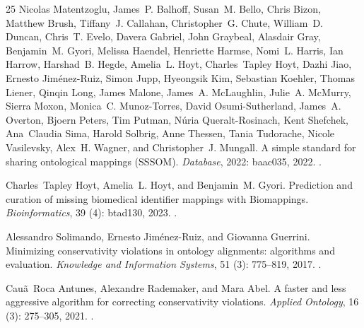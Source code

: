 \documentclass[10pt]{article}
\theoremstyle{accentdef}
\begin{document}
\begin{thebibliography}{25}
Nicolas Matentzoglu, James~P. Balhoff, Susan~M. Bello, Chris Bizon, Matthew
  Brush, Tiffany~J. Callahan, Christopher~G. Chute, William~D. Duncan, Chris~T.
  Evelo, Davera Gabriel, John Graybeal, Alasdair Gray, Benjamin~M. Gyori,
  Melissa Haendel, Henriette Harmse, Nomi~L. Harris, Ian Harrow, Harshad~B.
  Hegde, Amelia~L. Hoyt, Charles~Tapley Hoyt, Dazhi Jiao, Ernesto
  Jim{\'e}nez-Ruiz, Simon Jupp, Hyeongsik Kim, Sebastian Koehler, Thomas
  Liener, Qinqin Long, James Malone, James~A. McLaughlin, Julie~A. McMurry,
  Sierra Moxon, Monica~C. Munoz-Torres, David Osumi-Sutherland, James~A.
  Overton, Bjoern Peters, Tim Putman, Núria Queralt-Rosinach, Kent Shefchek,
  Ana~Claudia Sima, Harold Solbrig, Anne Thessen, Tania Tudorache, Nicole
  Vasilevsky, Alex~H. Wagner, and Christopher~J. Mungall.
\newblock A simple standard for sharing ontological mappings ({SSSOM}).
\newblock \emph{Database}, 2022: baac035, 2022.
\newblock {}.

Charles~Tapley Hoyt, Amelia~L. Hoyt, and Benjamin~M. Gyori.
\newblock Prediction and curation of missing biomedical identifier mappings
  with {Biomappings}.
\newblock \emph{Bioinformatics}, 39 (4): btad130, 2023.
\newblock {}.

Alessandro Solimando, Ernesto Jim{\'e}nez-Ruiz, and Giovanna Guerrini.
\newblock Minimizing conservativity violations in ontology alignments:
  algorithms and evaluation.
\newblock \emph{Knowledge and Information Systems}, 51 (3):
  775--819, 2017.
\newblock {}.

Cau{\~a}~Roca Antunes, Alexandre Rademaker, and Mara Abel.
\newblock A faster and less aggressive algorithm for correcting conservativity
  violations.
\newblock \emph{Applied Ontology}, 16 (3): 275--305, 2021.
\newblock {}.


\end{thebibliography}
\end{document}
